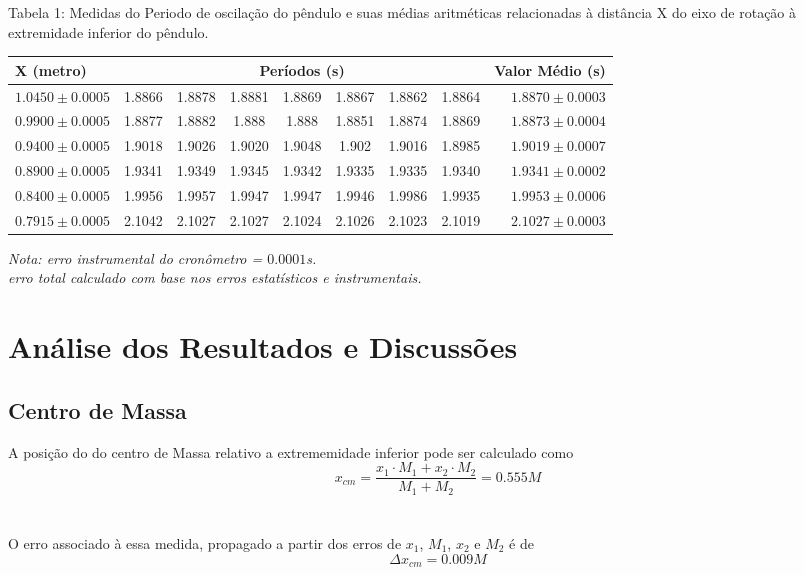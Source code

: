 \documentclass[12pt,a4paper]{article}
\begin{document}
\begin{table}[!htbp]

{Tabela 1: Medidas do Periodo de oscilação do pêndulo e suas médias aritméticas relacionadas à distância X do eixo de rotação à extremidade inferior do pêndulo.}\\[10pt] 	%

\def\arraystretch{1.5}
\begin{tabular}{|l| c c c c c c c|r|}
\hline 
X (metro) & \multicolumn{7}{c|}{Períodos (s)} & {Valor Médio (s)} \\ 
\hline
$1.0450\pm0.0005$ & 1.8866 & 1.8878 & 1.8881 & 1.8869 & 1.8867 & 1.8862 & 1.8864 & $1.8870 \pm 0.0003 $ \\
\hline
$0.9900\pm0.0005$ & 1.8877 & 1.8882 & 1.888 & 1.888 & 1.8851 & 1.8874 & 1.8869 & $1.8873 \pm 0.0004 $\\
\hline
$0.9400\pm0.0005$ & 1.9018 & 1.9026 & 1.9020 & 1.9048 & 1.902 & 1.9016 & 1.8985 & $1.9019 \pm 0.0007$\\
\hline
$0.8900\pm0.0005$ & 1.9341 & 1.9349 & 1.9345 & 1.9342 & 1.9335 & 1.9335 & 1.9340 & $1.9341 \pm 0.0002$\\
\hline
$0.8400\pm0.0005$ & 1.9956 & 1.9957 & 1.9947 & 1.9947 & 1.9946 & 1.9986 & 1.9935 & $1.9953 \pm 0.0006$\\
\hline
$0.7915\pm0.0005$ & 2.1042 & 2.1027 & 2.1027 & 2.1024 & 2.1026 & 2.1023 & 2.1019 & $2.1027 \pm 0.0003 $\\
\hline
\end{tabular}

\emph{Nota: erro instrumental do cronômetro = $0.0001$s.\\ erro total calculado com base nos erros estatísticos e instrumentais.}
\end{table}


\newpage

\section{Análise dos Resultados e Discussões}
\subsection{Centro de Massa}
A posição do do centro de Massa relativo a extrememidade inferior pode ser calculado como\\
$$ x_{cm} = \frac{x_1 \cdot M_1 + x_2 \cdot M_2}{M_1 + M_2} = 0.555 M $$\\ \\
O erro associado à essa medida, propagado a partir dos erros de $x_1$, $M_1$, $x_2$ e $M_2$ é de 
$$ \Delta x_{cm} =  0.009 M $$
\end{document}

